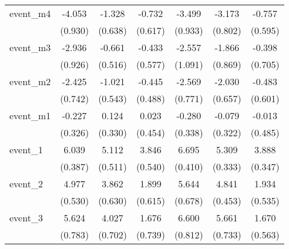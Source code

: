 {\begin{tabular}{l*{6}{c}}
event\_m4    &      -4.053\sym{***}&      -1.328\sym{*}  &      -0.732         &      -3.499\sym{***}&      -3.173\sym{***}&      -0.757         \\
            &     (0.930)         &     (0.638)         &     (0.617)         &     (0.933)         &     (0.802)         &     (0.595)         \\
[1em]
event\_m3    &      -2.936\sym{**} &      -0.661         &      -0.433         &      -2.557\sym{*}  &      -1.866\sym{*}  &      -0.398         \\
            &     (0.926)         &     (0.516)         &     (0.577)         &     (1.091)         &     (0.869)         &     (0.705)         \\
[1em]
event\_m2    &      -2.425\sym{**} &      -1.021         &      -0.445         &      -2.569\sym{***}&      -2.030\sym{**} &      -0.483         \\
            &     (0.742)         &     (0.543)         &     (0.488)         &     (0.771)         &     (0.657)         &     (0.601)         \\
[1em]
event\_m1    &      -0.227         &       0.124         &       0.023         &      -0.280         &      -0.079         &      -0.013         \\
            &     (0.326)         &     (0.330)         &     (0.454)         &     (0.338)         &     (0.322)         &     (0.485)         \\
[1em]
event\_1     &       6.039\sym{***}&       5.112\sym{***}&       3.846\sym{***}&       6.695\sym{***}&       5.309\sym{***}&       3.888\sym{***}\\
            &     (0.387)         &     (0.511)         &     (0.540)         &     (0.410)         &     (0.333)         &     (0.347)         \\
[1em]
event\_2     &       4.977\sym{***}&       3.862\sym{***}&       1.899\sym{**} &       5.644\sym{***}&       4.841\sym{***}&       1.934\sym{***}\\
            &     (0.530)         &     (0.630)         &     (0.615)         &     (0.678)         &     (0.453)         &     (0.535)         \\
[1em]
event\_3     &       5.624\sym{***}&       4.027\sym{***}&       1.676\sym{*}  &       6.600\sym{***}&       5.661\sym{***}&       1.670\sym{**} \\
            &     (0.783)         &     (0.702)         &     (0.739)         &     (0.812)         &     (0.733)         &     (0.563)         \\

\end{tabular}}
